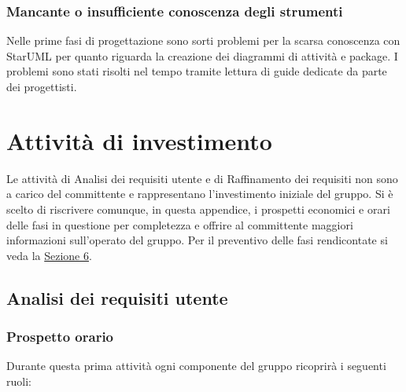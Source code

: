 \documentclass[a4paper, titlepage]{article}
\begin{document}
	\subsubsection{Mancante o insufficiente conoscenza degli strumenti}
	Nelle prime fasi di progettazione sono sorti problemi per la scarsa conoscenza con StarUML per quanto riguarda la creazione dei diagrammi di attività e package. I problemi sono stati risolti nel tempo tramite lettura di guide dedicate da parte dei progettisti.
	
	
	\newpage
	\section{Attività di investimento} \label{Investimento}
	Le attività di Analisi dei requisiti utente e di Raffinamento dei requisiti non sono a carico del committente e rappresentano l'investimento iniziale del gruppo. Si è scelto di riscrivere comunque, in questa appendice, i prospetti economici e orari delle fasi in questione per completezza e offrire al committente maggiori informazioni sull'operato del gruppo. Per il preventivo delle fasi rendicontate si veda la \hyperref[Preventivo] {Sezione 6}.
	
	
	\subsection{Analisi dei requisiti utente}
	\subsubsection{Prospetto orario}
	Durante questa prima attività ogni componente del gruppo ricoprirà i seguenti ruoli:
	
\end{document}
